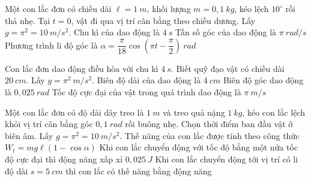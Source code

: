 \PhanII
\setcounter{ex}{0}
\begin{ex}
Một con lắc đơn có chiều dài $\ell = 1\ m$, khối lượng $m = 0,1\ kg$, kéo lệch $10^\circ$ rồi thả nhẹ. Tại $t = 0$, vật đi qua vị trí cân bằng theo chiều dương. Lấy $g=\pi^2 = 10\ m/s^2$.
{Chu kì của dao động là $4\ s$}
{\True Tần số góc của dao động là $\pi\ rad/s$}
{\True Phương trình li độ góc là $\alpha = \dfrac{\pi}{18} \cos(\pi t - \dfrac{\pi}{2})\ rad$}
\end{ex}
\begin{ex}
Con lắc đơn dao động điều hòa với chu kì $4 \ s$. Biết quỹ đạo vật có chiều dài $20 \ cm$. Lấy $g=\pi^2\ m/s^2$.
{Biên độ dài của dao động là $4\ cm$}
{\True Biên độ góc dao động là $0,025\ rad$}
{Tốc độ cực đại của vật trong quá trình dao động là $\pi\ m/s$}
\loigiai{
\begin{itemchoice}
\itemch
\itemch
\itemch
\itemch
\end{itemchoice}
}
\end{ex} 
\begin{ex}
Một con lắc đơn có độ dài dây treo là $1\ m$ và treo quả nặng $1\ kg$, kéo con lắc lệch khỏi vị trí cân bằng góc $0,1\ rad$ rồi buông nhẹ. Chọn thời điểm ban đầu vật ở biên âm. Lấy $g=\pi^2=10\ m/s^2$.
{\True Thế năng của con lắc được tính theo công thức \linebreak $W_t = mg\ell(1 - \cos\alpha)$}
{Khi con lắc chuyển động với tốc độ bằng một nửa tốc độ cực đại thì động năng xấp xỉ $0,025\ J$}
{Khi con lắc chuyển động tới vị trí có li độ dài $s = 5\ cm$ thì con lắc có thế năng bằng động năng}
\end{ex}
